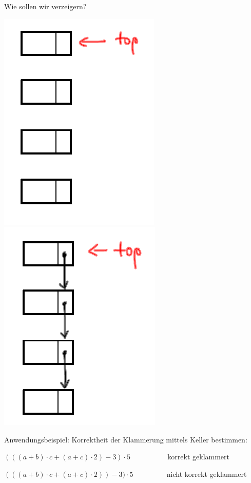 \documentclass{beamer}
\begin{document}
\begin{frame}[fragile]
Wie sollen wir verzeigern?

\includegraphics[scale=0.6]{keller1.png} \pause 
\includegraphics[scale=0.6]{keller2.png}

\end{frame}

\begin{frame}[fragile]
Anwendungsbeispiel: 
Korrektheit der Klammerung mittels Keller bestimmen:

$(((a+b) \cdot c + (a+c) \cdot 2) -3) \cdot 5$     ~~~~~~~~~ korrekt geklammert

$(((a+b) \cdot c + (a+c) \cdot 2)) -3) \cdot 5$   ~~~~~~~~ nicht korrekt geklammert

\end{frame}
\end{document}
